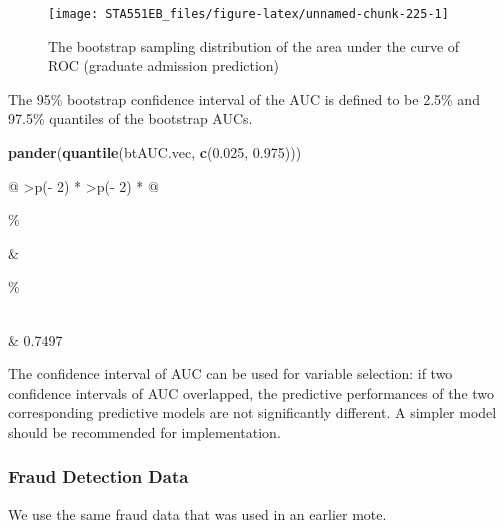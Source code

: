 \documentclass[
]{book}
\newenvironment{Shaded}{\begin{snugshade}}{\end{snugshade}}
\newcommand{\FloatTok}[1]{\textcolor[rgb]{0.00,0.00,0.81}{#1}}
\newcommand{\FunctionTok}[1]{\textcolor[rgb]{0.13,0.29,0.53}{\textbf{#1}}}
\newcommand{\NormalTok}[1]{#1}
\begin{document}
\begin{figure}

{\centering \texttt{[image: STA551EB\_files/figure-latex/unnamed-chunk-225-1]} 

}

\caption{ The bootstrap sampling distribution of the area under the curve of ROC (graduate admission prediction)}\label{fig:unnamed-chunk-225}
\end{figure}

The 95\% bootstrap confidence interval of the AUC is defined to be 2.5\% and 97.5\% quantiles of the bootstrap AUCs.

\begin{Shaded}
\begin{Highlighting}[]
\FunctionTok{pander}\NormalTok{(}\FunctionTok{quantile}\NormalTok{(btAUC.vec, }\FunctionTok{c}\NormalTok{(}\FloatTok{0.025}\NormalTok{, }\FloatTok{0.975}\NormalTok{)))}
\end{Highlighting}
\end{Shaded}

\begin{longtable}[]{@{}
  >{\centering\arraybackslash}p{(\columnwidth - 2\tabcolsep) * }
  >{\centering\arraybackslash}p{(\columnwidth - 2\tabcolsep) * }@{}}
\toprule\noalign{}
\begin{minipage}[b]{\linewidth}\%
\end{minipage} & \begin{minipage}[b]{\linewidth}\%
\end{minipage} \\
\midrule\noalign{}
\endhead
\bottomrule\noalign{}
 & 0.7497 \\
\end{longtable}

The confidence interval of AUC can be used for variable selection: if two confidence intervals of AUC overlapped, the predictive performances of the two corresponding predictive models are not significantly different. A simpler model should be recommended for implementation.

\hfill\break

\hypertarget{fraud-detection-data}{%
\subsubsection{Fraud Detection Data}\label{fraud-detection-data}}

We use the same fraud data that was used in an earlier mote.
\end{document}
